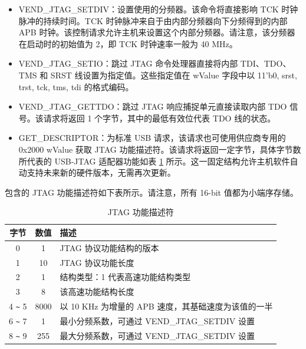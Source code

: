 \documentclass[main\_\_CN.tex]{subfiles}
\begin{document}
\begin{itemize}
\item VEND\_JTAG\_SETDIV：设置使用的分频器。该命令将直接影响 TCK 时钟脉冲的持续时间。TCK 时钟脉冲来自于由内部分频器向下分频得到的内部 APB 时钟。该控制请求允许主机来设置这个内部分频器。请注意，该分频器在启动时的初始值为 2，即 TCK 时钟速率一般为 40 MHz。

\item VEND\_JTAG\_SETIO：跳过 JTAG 命令处理器直接将内部 TDI、TDO、TMS 和 SRST 线设置为指定值。这些指定值在 wValue 字段中以 {11'b0, srst, trst, tck, tms, tdi} 的格式编码。

\item VEND\_JTAG\_GETTDO：跳过 JTAG 响应捕捉单元直接读取内部 TDO 信号。该请求将返回 1 个字节，其中的最低有效位代表 TDO 线的状态。

\item GET\_DESCRIPTOR：为标准 USB 请求，该请求也可使用供应商专用的 0x2000 wValue 获取 JTAG 功能描述符。该请求将返回一定字节，具体字节数所代表的 USB-JTAG 适配器功能如表 \ref{tab:usbserialjtag-capabilities-descriptor} 所示。这一固定结构允许主机软件自动支持未来新的硬件版本，无需再次更新。
\end{itemize}

\chipname{} 包含的 JTAG 功能描述符如下表所示。请注意，所有 16-bit 值都为小端序存储。

\begin{table}[H]
    \centering
    \caption{JTAG 功能描述符}
    \label{tab:usbserialjtag-capabilities-descriptor}
    \begin{tabular}{ |c|c|l| } 
    \hline
        \rowcolor{lightgray}
        \textbf{字节} & \textbf{数值} & \textbf{描述} \\\hline
        
        0 &    1 &     JTAG 协议功能结构的版本 \\\hline
        1 &    10 &    JTAG 协议功能长度 \\\hline
        2 &    1 &     结构类型：1 代表高速功能结构类型 \\\hline
        3 &    8 &     该高速功能结构长度 \\\hline
        4 \verb+~+ 5 &  8000 &  以 10 KHz 为增量的 APB 速度，其基础速度为该值的一半\\\hline
        6 \verb+~+ 7 &  1 &     最小分频系数，可通过 VEND\_JTAG\_SETDIV 设置  \\\hline
        8 \verb+~+ 9 &  255 &   最大分频系数，可通过 VEND\_JTAG\_SETDIV 设置 \\\hline
    \end{tabular}
\end{table}
\end{document}
